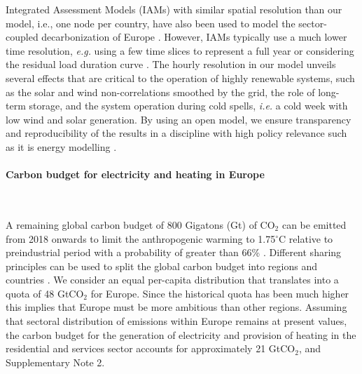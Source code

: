 \documentclass[5p]{elsarticle} %
\begin{document}
Integrated Assessment Models (IAMs) with similar spatial resolution than our model, i.e., one node per country, have also been used to model the sector-coupled decarbonization of Europe \cite{in-depth_2018, JRC-EU-TIMES, Creutzig_2017}. However, IAMs typically use a much lower time resolution, \textit{e.g.} using a few time slices to represent a full year \cite{JRC-EU-TIMES, Loffler_2019, Poncelet_2016, McGlade_2015, Babrowski_2014} or considering the residual load duration curve \cite{Creutzig_2017, Ueckerdt_2017}. The hourly resolution in our model unveils several effects that are critical to the operation of highly renewable systems, such as the solar and wind non-correlations smoothed by the grid, the role of long-term storage, and the system operation during cold spells, \textsl{i.e.} a cold week with low wind and solar generation. By using an open model, we ensure transparency and reproducibility of the results in a  discipline with high policy relevance such as it is energy modelling \cite{Pfenninger_2017, Pfenninger_2018}. 

\paragraph{\textbf{Carbon budget for electricity and heating in Europe}} \

A remaining global carbon budget of 800 Gigatons (Gt) of CO$_2$ can be emitted from 2018 onwards to limit the anthropogenic warming to 1.75$^{\circ}$C relative to preindustrial period with a probability of greater than 66\% \cite{IPCC_1.5}. Different sharing principles can be used to split the global carbon budget into regions and countries \cite{Raupach_2014}. We consider an equal per-capita distribution that translates into a quota of 48 GtCO$_2$ for Europe. Since the historical quota has been much higher this implies that Europe must be more ambitious than other regions. Assuming that sectoral distribution of emissions within Europe remains at present values, the carbon budget for the generation of electricity and provision of heating in the residential and services sector accounts for approximately 21 GtCO$_2$, \cite{UNFCCC_inventory} and Supplementary Note 2. %
\end{document}
